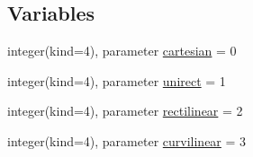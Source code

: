 \subsection*{Variables}
\begin{DoxyCompactItemize}
\item 
integer(kind=4), parameter \hyperlink{namespacegrid_a93002a1fdf205e858b27917e5ef07e87}{cartesian} = 0
\item 
integer(kind=4), parameter \hyperlink{namespacegrid_ae5c8d9b8d49f1a584ddc38e794825323}{unirect} = 1
\item 
integer(kind=4), parameter \hyperlink{namespacegrid_a56b6da89996d538d28fc889ff68ce087}{rectilinear} = 2
\item 
integer(kind=4), parameter \hyperlink{namespacegrid_a5e3aa0692b948da96fa11d90eb6c17ff}{curvilinear} = 3
\end{DoxyCompactItemize}
